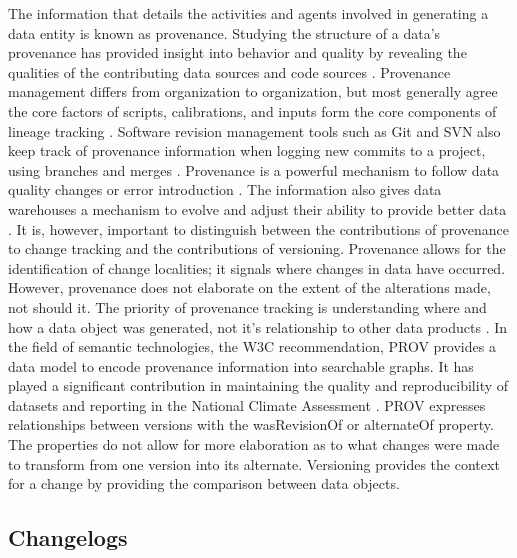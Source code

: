 The information that details the activities and agents involved in generating a data entity is known as provenance.
Studying the structure of a data's provenance has provided insight into behavior and quality by revealing the qualities of the contributing data sources and code sources \cite{dai2014provenance} \cite{Cavanaugh2002}.
Provenance management differs from organization to organization, but most generally agree the core factors of scripts, calibrations, and inputs form the core components of lineage tracking \cite{Barkstrom2003} \cite{Branco2008}.
Software revision management tools such as Git and SVN also keep track of provenance information when logging new commits to a project, using branches and merges  \cite{Chacon:2009:PG:1618548}.
Provenance is a powerful mechanism to follow data quality changes or error introduction .
The information also gives data warehouses a mechanism to evolve and adjust their ability to provide better data \cite{Vassiliadis1999}.
It is, however, important to distinguish between the contributions of provenance to change tracking and the contributions of versioning.
Provenance allows for the identification of change localities; it signals where changes in data have occurred.
However, provenance does not elaborate on the extent of the alterations made, not should it.
The priority of provenance tracking is understanding where and how a data object was generated, not it's relationship to other data products \cite{Bose:2005:LRS:1057977.1057978}.
In the field of semantic technologies, the W3C recommendation, PROV provides a data model to encode provenance information into searchable graphs.
It has played a significant contribution in maintaining the quality and reproducibility of datasets and reporting in the National Climate Assessment \cite{Tilmes2012,Ma2014191,Ma2014}.
PROV expresses relationships between versions with the wasRevisionOf or alternateOf property.
The properties do not allow for more elaboration as to what changes were made to transform from one version into its alternate.
Versioning provides the context for a change by providing the comparison between data objects.

\subsection{Changelogs}

